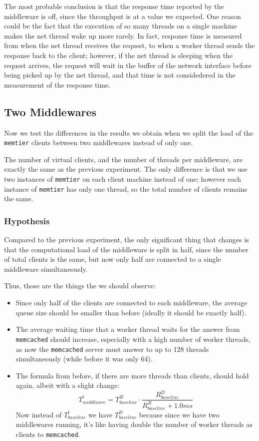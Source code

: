 \documentclass[11pt,a4paper]{article}
\renewcommand{\t}[1]{%
	{\texttt{#1}}}
\begin{document}
The most probable conclusion is that the response time reported by the
middleware is off, since the throughput is at a value we expected.  One reason
could be the fact that the execution of so many threads on a single machine
makes the net thread wake up more rarely. In fact, response time is measured
from when the net thread receives the request, to when a worker thread sends
the response back to the client; however, if the net thread is sleeping when
the request arrives, the request will wait in the buffer of the network
interface before being picked up by the net thread, and that time is not
considedered in the measurement of the response time.
		



\subsection{Two Middlewares}

Now we test the differences in the results we obtain when we split the load of
the \t{memtier} clients between two middlewares instead of only one.

The number of virtual clients, and the number of threads per middleware, 
are exactly the same as the previous experiment. The only difference is that
we use two instances of \t{memtier} on each client machine instead of one; however
each instance of \t{memtier} has only one thread, so the total number of clients
remains the same.



\subsubsection{Hypothesis}

Compared to the previous experiment, the only significant thing that changes is that the computational load of the middleware
is split in half, since the number of total clients is the same, but now only half are connected to a single middleware simultaneously.

Thus, those are the things the we should observe:
\begin{itemize}
	\item Since only half of the clients are connected to each middleware, the average queue size should be smaller than before (ideally it should be exactly half).
	\item The average waiting time that a worker thread waits for the answer from \t{memcached} should increase,
		especially with a high number of worker threads, as now the \t{memcached} server must answer to up to 128 threads
		simultaneously (while before it was only 64).
	\item The formula from before, if there are more threads than clients, should hold again, albeit with a slight change:
	$$
		T_{middlware}^t = T_{baseline}^{2t} \cdot \frac{R_{baseline}^{2t}}{R_{baseline}^{2t} + 1.0ms}
	$$
		Now instead of $T_{baseline}^t$ we have $T_{baseline}^{2t}$ because since we have two middlewares running, it's 
		like having double the number of worker threads as clients to \t{memcached}.
\end{itemize}
\end{document}
